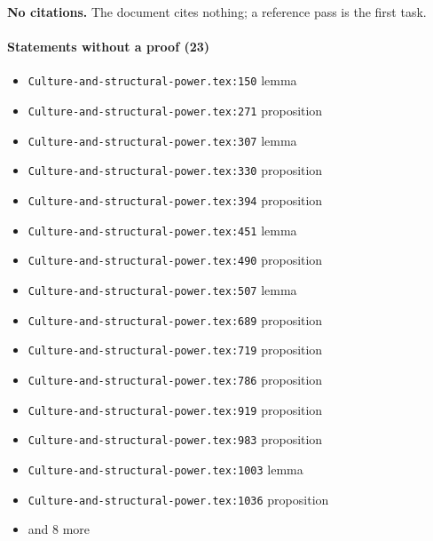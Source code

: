 \documentclass[11pt]{article}
\newcommand{\loc}[1]{{\small\color{muted}\texttt{#1}}}
\begin{document}
\textbf{No citations.} The document cites nothing; a reference pass is the first task.

\paragraph{Statements without a proof (23)}
\begin{itemize}
\item \loc{Culture-and-structural-power.tex:150} lemma
\item \loc{Culture-and-structural-power.tex:271} proposition
\item \loc{Culture-and-structural-power.tex:307} lemma
\item \loc{Culture-and-structural-power.tex:330} proposition
\item \loc{Culture-and-structural-power.tex:394} proposition
\item \loc{Culture-and-structural-power.tex:451} lemma
\item \loc{Culture-and-structural-power.tex:490} proposition
\item \loc{Culture-and-structural-power.tex:507} lemma
\item \loc{Culture-and-structural-power.tex:689} proposition
\item \loc{Culture-and-structural-power.tex:719} proposition
\item \loc{Culture-and-structural-power.tex:786} proposition
\item \loc{Culture-and-structural-power.tex:919} proposition
\item \loc{Culture-and-structural-power.tex:983} proposition
\item \loc{Culture-and-structural-power.tex:1003} lemma
\item \loc{Culture-and-structural-power.tex:1036} proposition
\item[] {\color{muted}\small and 8 more}
\end{itemize}
\end{document}
